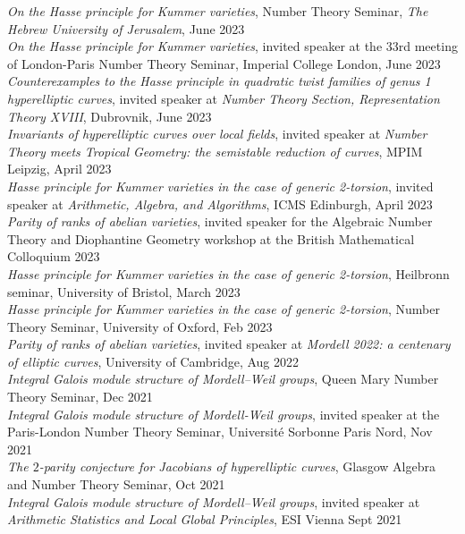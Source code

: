 \documentclass{res}
\begin{document}
\begin{resume}
 
{\it  On the Hasse principle for Kummer varieties}, Number Theory Seminar, {\it The Hebrew University of Jerusalem}, June 2023    \medskip  \\
{\it  On the Hasse principle for Kummer varieties}, invited speaker at the 33rd meeting of London-Paris Number Theory Seminar, Imperial College London, June 2023    \medskip  \\
{\it  Counterexamples to the Hasse principle in quadratic twist families of genus 1
hyperelliptic curves}, invited speaker at {\it Number Theory Section, Representation Theory XVIII}, Dubrovnik, June 2023    \medskip  \\
{\it  Invariants of hyperelliptic curves over local fields}, invited speaker at {\it Number Theory meets Tropical Geometry: the semistable reduction of curves}, MPIM Leipzig, April 2023    \medskip  \\
{\it  Hasse principle for Kummer varieties in the case of generic 2-torsion}, invited speaker at {\it Arithmetic, Algebra, and Algorithms}, ICMS Edinburgh, April 2023    \medskip  \\
{\it  Parity of ranks of abelian varieties}, invited speaker for the Algebraic Number Theory and Diophantine Geometry workshop at the British Mathematical Colloquium 2023 \medskip  \\
{\it  Hasse principle for Kummer varieties in the case of generic 2-torsion}, Heilbronn seminar, University of Bristol, March 2023    \medskip  \\
{\it  Hasse principle for Kummer varieties in the case of generic 2-torsion}, Number Theory Seminar, University of Oxford, Feb 2023    \medskip  \\
{\it  Parity of ranks of abelian varieties}, invited speaker at {\it Mordell 2022: a centenary of elliptic curves}, University of Cambridge, Aug 2022    \medskip  \\
{\it  Integral Galois module structure of Mordell--Weil groups}, Queen Mary Number Theory Seminar, Dec 2021   \medskip  \\
{\it  Integral Galois module structure of Mordell-Weil groups}, invited speaker at the Paris-London Number Theory Seminar, Université Sorbonne Paris Nord, Nov 2021  \medskip \\
{\it  The $2$-parity conjecture for Jacobians of hyperelliptic curves}, Glasgow Algebra and Number Theory Seminar, Oct 2021    \medskip  \\
{\it  Integral Galois module structure of Mordell--Weil groups}, invited speaker at {\it Arithmetic Statistics and Local Global Principles}, ESI Vienna Sept 2021    \medskip  \\

\end{resume}
\end{document}
